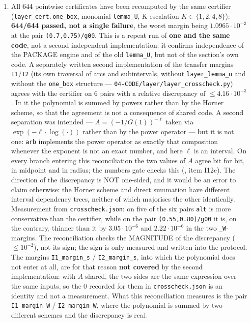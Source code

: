 \begin{enumerate}
\item All 644 pointwise certificates have been recomputed by the same
   certifier (\texttt{layer\_\allowbreak cert.one\_\allowbreak box}, monomial \texttt{lemma\_U}, K-escalation
   $K \in \{1,2,4,8\}$): \textbf{644/644 passed, not a single failure}, the worst
   margin being $1.0965\cdot 10^{-3}$ at the pair \texttt{(0.7,0.75)/\allowbreak g00}. This is a
   repeat run of \textbf{one and the same code}, not a second independent
   implementation: it confirms independence of the PACKAGE engine and of
   the old \texttt{lemma\_U}, but not of the section's own code. A separately
   written second implementation of the transfer margins \texttt{I1}/\texttt{I2} (its
   own traversal of arcs and subintervals, without \texttt{layer\_\allowbreak lemma\_\allowbreak u} and
   without the \texttt{one\_box} structure --- \texttt{04-\allowbreak CODE/\allowbreak layer/\allowbreak layer\_\allowbreak crosscheck.py})
   agrees with the certifier on 6 pairs with a relative discrepancy of
   $\leq 4.16\cdot 10^{-3}$. In it the polynomial is summed by powers rather
   than by the Horner scheme, so that the agreement is not a consequence
   of shared code. A second separation was intended --- $A = (-1/G(1))^{-\ell}$
   taken via $\exp(-\ell \cdot \log(\cdot))$ rather than by the power operator
   --- but it is not one: \texttt{arb} implements the power operator as exactly
   that composition whenever the exponent is not an exact number, and here
   $\ell$ is an interval. On every branch entering this reconciliation the
   two values of $A$ agree bit for bit, in midpoint and in radius; the
   numbers gate checks this (, item I12c). The direction of the discrepancy is
   NOT one-sided, and it would be an error to claim otherwise: the Horner
   scheme and direct summation have different interval dependency trees,
   neither of which majorises the other identically. Measurement from
   \texttt{crosscheck.json}: on five of the six pairs \texttt{alt} is more conservative
   than the certifier, while on the pair \texttt{(0.55,0.80)/\allowbreak g00} it is, on the
   contrary, thinner than it by $3.05\cdot 10^{-6}$ and $2.22\cdot 10^{-6}$ in the two
   \texttt{\_W}-margins. The reconciliation checks the MAGNITUDE of the
   discrepancy ($\leq 10^{-2}$), not its sign; the sign is only measured and
   written into the protocol. The margins \texttt{I1\_margin\_s} / \texttt{I2\_margin\_s},
   into which the polynomial does not enter at all, are for that reason
   \textbf{not covered} by the second implementation: with $A$ shared, the two
   sides are the same expression over the same inputs, so the $0$ recorded
   for them in \texttt{crosscheck.json} is an identity and not a measurement.
   What this reconciliation measures is the pair \texttt{I1\_margin\_W} /
   \texttt{I2\_margin\_W}, where the polynomial is summed by two different schemes
   and the discrepancy is real.


\end{enumerate}
